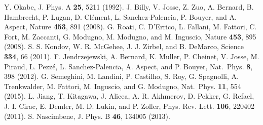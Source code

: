 \documentclass[prb,showpacs,twocolumn,aps,superscriptaddress,a4paper]{revtex4-1}
\begin{document}
\begin{thebibliography}{10}
Y. Okabe, J. Phys. A {\bf 25}, 5211 (1992).
J. Billy, V. Josse, Z. Zuo, A. Bernard, B. Hambrecht,
P. Lugan, D. Cl\'{e}ment, L. Sanchez-Palencia, P. Bouyer, and A. Aspect, Nature {\bf 453}, 891 (2008).
G. Roati, C. D'Errico, L. Fallani, M. Fattori,
C. Fort, M. Zaccanti, G. Modugno, M. Modugno, and M. Inguscio,
Nature {\bf 453}, 895 (2008).
 S. S. Kondov, W. R. McGehee, J. J. Zirbel, and B. DeMarco, Science \textbf{334}, 66 (2011).
 F. Jendrzejewski, A. Bernard, K. Muller, P. Cheinet, V. Josse, M. Piraud, L. Pezz\'e, L. Sanchez-Palencia, A. Aspect, and P. Bouyer, Nat.~Phys. \textbf{8}, 398 (2012).
 G. Semeghini, M. Landini, P. Castilho, S. Roy, G. Spagnolli,
A. Trenkwalder, M. Fattori, M. Inguscio, and G. Modugno, Nat.~Phys. \textbf{11}, 554 (2015).
 L. Jiang, T. Kitagawa, J. Alicea, A. R. Akhmerov, D. Pekker, G. Refael, J. I. Cirac,
E. Demler, M. D. Lukin, and P. Zoller, Phys. Rev. Lett. \textbf{106}, 220402 (2011).
 S. Nascimbene, J. Phys. B \textbf{46}, 134005 (2013).
\end{thebibliography}
\end{document}
